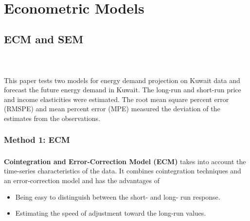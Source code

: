 \chapter{Econometric Models}\label{chp:Econometric_Models}




\section{ECM and SEM}
\cite{NaiefEltony1995}\\
	 \paragraph{}{This paper tests two models for energy demand projection on Kuwait data and forecast the future energy demand in Kuwait. The long-run and short-run price and income elasticities were estimated. The root mean square percent error (RMSPE) and mean percent error (MPE) measured the deviation of the estimates from the observations. }


\subsection{Method 1: ECM}
\paragraph{}{
\textbf{Cointegration and Error-Correction Model (ECM)} takes into account the time-series characteristics of the data. It combines cointegration techniques and an error-correction model and has the advantages of
\begin{itemize}
	\item Being easy to distinguish between the short- and long- run response.
	\item Estimating the speed of adjustment toward the long-run values.
\end{itemize} 	
}


